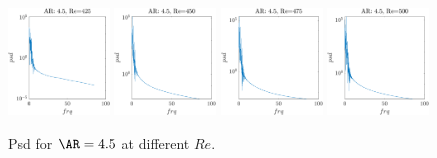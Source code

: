 \begin{figure}
  \centering
  \includegraphics[width=0.24\textwidth]{./fig/nnl/psdAR4.5RE425.png}
  \includegraphics[width=0.24\textwidth]{./fig/nnl/psdAR4.5RE450.png}
  \includegraphics[width=0.24\textwidth]{./fig/nnl/psdAR4.5RE475.png}
  \includegraphics[width=0.24\textwidth]{./fig/nnl/psdAR4.5RE500.png}
  \caption{Psd for $\AR=4.5$ at different $Re$.}
  \label{fig:ClCd}
\end{figure}

